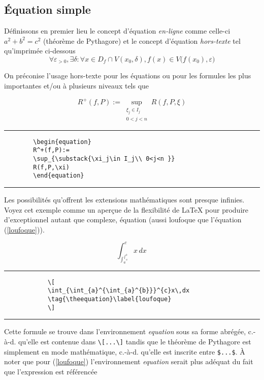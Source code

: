 	\subsection{Équation simple}
	Définissons en premier lieu le concept d'équation \textit{en-ligne} comme celle-ci $a^2+b^2=c^2$ (théorème de Pythagore) et le concept d'équation  \textit{hors-texte}  tel qu'imprimée ci-dessous 
	\[
	\forall\varepsilon_{>0},\exists\delta : \forall x \in D_f \cap V(x_0,\delta), f(x)\in V\big(f(x_0),\varepsilon\big)
	\]
	\par On préconise l'usage hors-texte pour les équations ou pour les formules les plus importantes et/ou à plusieurs niveaux tels que
%
	\begin{table}[H]
		\centering
		\begin{equation}
		R^+(f,P):=\sup_{\substack{\xi_j\in I_j \\
				0<j<n }}
		R(f,P,\xi)\label{darboux}
		\end{equation}	
		\hrule
		\begin{verbatim}
		\begin{equation}
		R^+(f,P):=
		\sup_{\substack{\xi_j\in I_j\\ 0<j<n }}
		R(f,P,\xi)
		\end{equation}
		\end{verbatim}
		\hrule
	\end{table}
%
	\par Les possibilités qu'offrent les extensions mathématiques sont presque infinies. Voyez cet exemple comme un aperçue de la flexibilité de \LaTeX{} pour produire d'exceptionnel autant que complexe, équation (aussi loufoque que l'équation (\ref{loufoque})).
%
	\begin{table}[H]
		\setcounter{equation}{2}
		\centering
		\[
		\int_{\int_{a}^{\int_{a}^{b}}}^{c}x\,dx\, 
		\tag{\theequation}\label{loufoque}
		\]
		\hrule
		\begin{verbatim}
			\[
			\int_{\int_{a}^{\int_{a}^{b}}}^{c}x\,dx
			\tag{\theequation}\label{loufoque}
			\]
		\end{verbatim}
		\hrule
	\end{table}
%
	\par Cette formule se trouve dans l'environnement \textit{equation} sous sa forme abrégée, c.-à-d. qu'elle est contenue dans \verb|\[...\]| tandis que le théorème de Pythagore est simplement en mode mathématique, c.-à-d. qu'elle est inscrite entre  \verb|$...$|. À noter que pour (\ref{loufoque}) l'environnement \textit{equation} serait plus adéquat du fait que l'expression est référencée%
